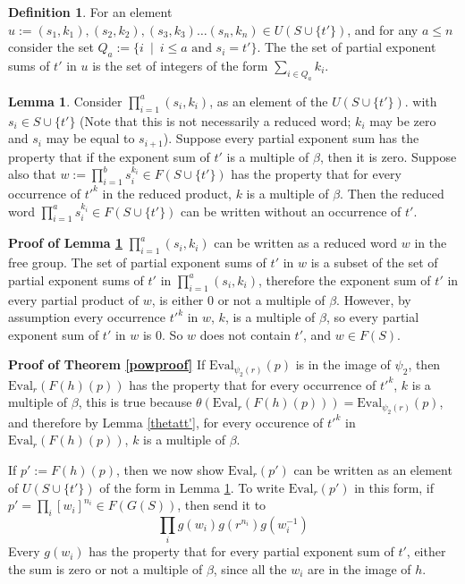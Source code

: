 \documentclass[12pt]{article} %
\theoremstyle{definition}
\theoremstyle{definition}
\theoremstyle{definition}
\newtheorem{lemma}[thm]{Lemma}
\theoremstyle{definition}
\newtheorem{defn}[thm]{Definition}
\begin{document}
\begin{defn}
  For an element $u := (s_1, k_1), (s_2, k_2), (s_3, k_3) \dots (s_n, k_n) \in U(S \cup \{t'\})$,
  and for any $a \le n$
  consider the set $Q_a := \{ i \ \mid \ i \le a \text{ and } s_i = t' \}$.
  The the set of partial exponent sums of $t'$ in $u$ is the set of integers of the
  form $\sum_{i \in Q_a} k_i$.
\end{defn}

\begin{lemma}\label{powproof1}
  Consider $\prod_{i = 1}^a (s_i, k_i)$, as an element of the $U(S \cup \{t' \})$.
  with $s_i \in S \cup \{t'\}$ (Note that this is not necessarily a reduced
  word; $k_i$ may be zero and $s_i$ may be equal to $s_{i+1}$).
  Suppose every partial exponent sum has the property that if the exponent sum of
  $t'$ is a multiple of $\beta$, then it is zero. Suppose also that
  $w := \prod_{i = 1}^b s_i^{k_i} \in F(S \cup \{t'\})$ has the
  property that for every occurrence of $t'^k$ in the reduced product,
  $k$ is a multiple of $\beta$. Then the reduced word
  $\prod_{i = 1}^a s_i^{k_i} \in F(S \cup \{t'\})$
  can be written without an occurrence of $t'$.
\end{lemma}

\textbf{Proof of Lemma \ref{powproof1}}
$\prod_{i = 1}^a (s_i, k_i)$ can be written as a reduced word $w$ in the free group.
The set of partial exponent sums of $t'$ in $w$
is a subset of the set of partial exponent sums of $t'$ in $\prod_{i = 1}^a (s_i, k_i)$,
therefore the exponent sum of $t'$ in every partial product of $w$, is
either $0$ or not a multiple of $\beta$.
However, by assumption every occurrence $t'^k$ in $w$, $k$,
is a multiple of $\beta$, so every partial exponent sum of $t'$ in $w$ is $0$.
So $w$ does not contain $t'$, and $w \in F(S)$.

\textbf{Proof of Theorem \ref{powproof}} \newline
If $\text{Eval}_{\psi_2(r)}(p)$ is in the image of $\psi_2$, then
$\text{Eval}_{r}(F(h)(p))$ has the property
that for every occurrence of $t'^k$, $k$ is a multiple of $\beta$,
this is true because $\theta(\text{Eval}_{r}(F(h)(p))) =
\text{Eval}_{\psi_2(r)}(p)$, and therefore by Lemma \ref{thetatt'},
for every occurence of $t'^k$ in $\text{Eval}_{r}(F(h)(p))$, $k$
is a multiple of $\beta$.

If $p' := F(h)(p)$,
then we now show $\text{Eval}_{r}(p')$ can be written as an element of $U(S \cup \{t'\})$ of the form in
Lemma \ref{powproof1}.
To write $\text{Eval}_{r}(p')$ in this
form, if $p' = \prod_i \left[w_i\right]^{n_i} \in F(G(S))$, then send it to
\begin{equation} \label{eq:bigprod}
  \prod_i g(w_i)g(r^{n_i})g(w_i^{-1})
\end{equation}
Every $g(w_i)$ has the property that for every partial exponent sum of $t'$, either
the sum is zero or not a multiple of $\beta$, since all the $w_i$ are in the image of $h$.
\end{document}

